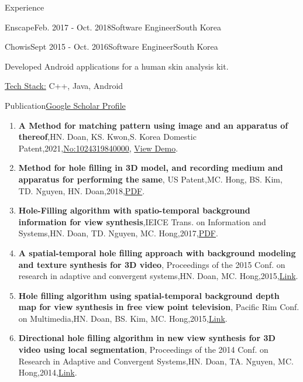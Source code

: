 \documentclass{resume}
\begin{document}
\begin{rSection}{Experience}
\begin{rSubsection}{Enscape}{Feb. 2017 - Oct. 2018}{Software Engineer}{South Korea}
		\end{rSubsection}

		\begin{rSubsection}{Chowis}{Sept 2015 - Oct. 2016}{Software Engineer}{South Korea}
			\item Developed Android applications for a human skin analysis kit.
			\item \underline{Tech Stack:} C++, Java, Android

		\end{rSubsection}
	\end{rSection}

	\begin{rSection}{Publication}\href{https://scholar.google.co.kr/citations?user=nhm8WBMAAAAJ&hl=en}{Google Scholar Profile}
	\begin{enumerate}[leftmargin=*]
		\item {\bf A Method for matching pattern using image and an apparatus of thereof},{HN. Doan, KS. Kwon},{S. Korea Domestic Patent},{2021},{\href{https://doi.org/10.8080/1020210025073}{No:1024319840000}}, \href{https://blog.naver.com/mvtech_ravid/222119961697}{View Demo}.
		\item {\bf Method for hole filling in 3D model, and recording medium and apparatus for performing the same},{ US Patent},{MC. Hong, BS. Kim, TD. Nguyen, HN. Doan},{2018},\href{https://patentimages.storage.googleapis.com/d5/ab/0a/111cb20d160a96/US9916694.pdf}{PDF}.
		\item {\bf Hole-Filling algorithm with spatio-temporal background information for view synthesis},{IEICE Trans. on Information and Systems},{HN. Doan, TD. Nguyen, MC. Hong},{2017},\href{https://www.jstage.jst.go.jp/article/transinf/E100.D/9/E100.D_2016PCP0010/_pdf}{PDF}.
		\item {\bf A spatial-temporal hole filling approach with background modeling and texture synthesis for 3D video},{ Proceedings of the 2015 Conf.  on research in adaptive and convergent systems},{HN. Doan, MC. Hong},{2015},\href{https://dl.acm.org/doi/abs/10.1145/2811411.2811497}{Link}.
		\item {\bf Hole filling algorithm using spatial-temporal background depth map for view synthesis in free view point television},{ Pacific Rim Conf.  on Multimedia},{HN. Doan, BS. Kim, MC. Hong},{2015},\href{https://link.springer.com/chapter/10.1007/978-3-319-24078-7_61}{Link}.
 		\item {\bf Directional hole filling algorithm in new view synthesis for 3D video using local segmentation},{ Proceedings of the 2014 Conf.  on Research in Adaptive and Convergent Systems},{HN. Doan, TA. Nguyen, MC. Hong},{2014},\href{https://dl.acm.org/doi/abs/10.1145/2663761.2664229}{Link}.
	\end{enumerate}	
	\end{rSection}
\end{document}
